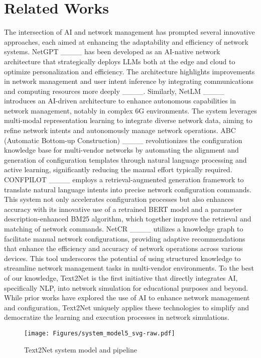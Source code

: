 \section{Related Works}
The intersection of AI and network management has prompted several innovative approaches, each aimed at enhancing the adaptability and efficiency of network systems. 
NetGPT ____ has been developed as an AI-native network architecture that strategically deploys LLMs both at the edge and cloud to optimize personalization and efficiency. The architecture highlights improvements in network management and user intent inference by integrating communications and computing resources more deeply ____. Similarly, NetLM ____ introduces an AI-driven architecture to enhance autonomous capabilities in network management, notably in complex 6G environments. The system leverages multi-modal representation learning to integrate diverse network data, aiming to refine network intents and autonomously manage network operations.
ABC (Automatic Bottom-up Construction) ____ revolutionizes the configuration knowledge base for multi-vendor networks by automating the alignment and generation of configuration templates through natural language processing and active learning, significantly reducing the manual effort typically required.
CONFPILOT ____ employs a retrieval-augmented generation framework to translate natural language intents into precise network configuration commands. This system not only accelerates configuration processes but also enhances accuracy with its innovative use of a retrained BERT model and a parameter description-enhanced BM25 algorithm, which together improve the retrieval and matching of network commands.
NetCR ____ utilizes a knowledge graph to facilitate manual network configurations, providing adaptive recommendations that enhance the efficiency and accuracy of network operations across various devices. This tool underscores the potential of using structured knowledge to streamline network management tasks in multi-vendor environments. To the best of our knowledge, Text2Net is the first initiative that directly integrates AI, specifically NLP, into network simulation for educational purposes and beyond. While prior works have explored the use of AI to enhance network management and configuration, Text2Net uniquely applies these technologies to simplify and democratize the learning and execution processes in network simulations. 
\begin{figure}[t!]
    \centering
    \texttt{[image: Figures/system\_model5\_svg-raw.pdf]}
    \caption{Text2Net system model and pipeline}
    \vspace{-4mm}
    \label{fig: system model}
\end{figure}